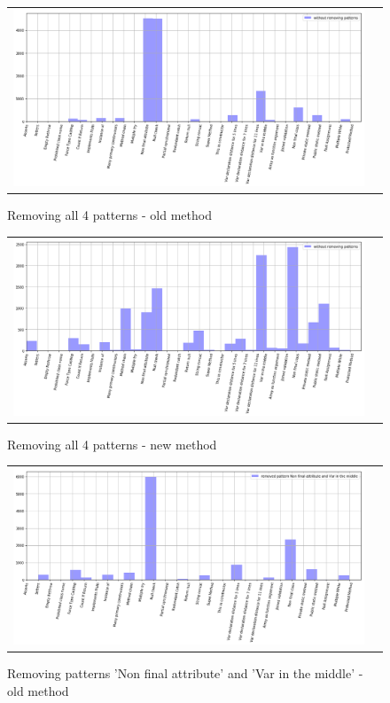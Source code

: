 \documentclass[12pt]{article}
\begin{document}
\begin{figure}[h!]\center
	\begin{tabular}{cc}
		\includegraphics[scale=0.4]{1-2.png}
	\end{tabular}
	\caption{Removing all 4 patterns - old method}
	\label{fig:ris1}
\end{figure}
\begin{figure}[h!]\center
	\begin{tabular}{cc}
		\includegraphics[scale=0.4]{1-1.png}
	\end{tabular}
	\caption{Removing all 4 patterns - new method}
	\label{fig:ris2}
\end{figure}
\newpage
\begin{figure}[h!]\center
	\begin{tabular}{cc}
		\includegraphics[scale=0.4]{2-2.png}
	\end{tabular}
	\caption{Removing patterns 'Non final attribute' and 'Var in the middle' - old method}
	\label{fig:ris3}
\end{figure}
\end{document}
